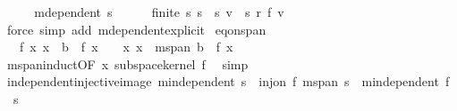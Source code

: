 \begin{isabellebody}
\ \ \isamarkupfalse%
\ \isamarkupfalse%
\ {\isachardoublequoteopen}m{}{\isachardot}{\kern0pt}dependent\ s{\isachardoublequoteclose}\isanewline
\ \ \ \ \isamarkupfalse%
\ {\isacartoucheopen}finite\ s{\isacharprime}{\kern0pt}{\isacartoucheclose}\ {\isacartoucheopen}s{\isacharprime}{\kern0pt}\ {\isasymsubseteq}\ s{\isacartoucheclose}\ {\isacartoucheopen}v\ {\isasymin}\ s{\isacharprime}{\kern0pt}{\isacartoucheclose}\ {\isacartoucheopen}r\ {\isacharparenleft}{\kern0pt}f\ v{\isacharparenright}{\kern0pt}\ {\isasymnoteq}\ {}{\isacartoucheclose}\ \isamarkupfalse%
\ {\isacharparenleft}{\kern0pt}force\ simp\ add{\isacharcolon}{\kern0pt}\ m{}{\isachardot}{\kern0pt}dependent{\isacharunderscore}{\kern0pt}explicit{\isacharparenright}{\kern0pt}\isanewline
{}\isamarkupfalse%
%
\endisatagproof
{\isafoldproof}%
%
\isadelimproof
\isanewline
%
\endisadelimproof
\isanewline
{}\isamarkupfalse%
\ eq{\isacharunderscore}{\kern0pt}{}{\isacharunderscore}{\kern0pt}on{\isacharunderscore}{\kern0pt}span{\isacharcolon}{\kern0pt}\isanewline
\ \ \ f{}{\isacharcolon}{\kern0pt}\ {\isachardoublequoteopen}{\isasymAnd}x{\isachardot}{\kern0pt}\ x\ {\isasymin}\ b\ {\isasymLongrightarrow}\ f\ x\ {\isacharequal}{\kern0pt}\ {}{\isachardoublequoteclose}\ \ x{\isacharcolon}{\kern0pt}\ {\isachardoublequoteopen}x\ {\isasymin}\ m{}{\isachardot}{\kern0pt}span\ b{\isachardoublequoteclose}\ \ {\isachardoublequoteopen}f\ x\ {\isacharequal}{\kern0pt}\ {}{\isachardoublequoteclose}\isanewline
%
\isadelimproof
\ \ %
\endisadelimproof
%
\isatagproof
{}\isamarkupfalse%
\ m{}{\isachardot}{\kern0pt}span{\isacharunderscore}{\kern0pt}induct{\isacharbrackleft}{\kern0pt}OF\ x\ subspace{\isacharunderscore}{\kern0pt}kernel{\isacharbrackright}{\kern0pt}\ f{}\ \isamarkupfalse%
\ simp%
\endisatagproof
{\isafoldproof}%
%
\isadelimproof
\isanewline
%
\endisadelimproof
\isanewline
{}\isamarkupfalse%
\ independent{\isacharunderscore}{\kern0pt}injective{\isacharunderscore}{\kern0pt}image{\isacharcolon}{\kern0pt}\ {\isachardoublequoteopen}m{}{\isachardot}{\kern0pt}independent\ s\ {\isasymLongrightarrow}\ inj{\isacharunderscore}{\kern0pt}on\ f\ {\isacharparenleft}{\kern0pt}m{}{\isachardot}{\kern0pt}span\ s{\isacharparenright}{\kern0pt}\ {\isasymLongrightarrow}\ m{}{\isachardot}{\kern0pt}independent\ {\isacharparenleft}{\kern0pt}f\ {\isacharbackquote}{\kern0pt}\ s{\isacharparenright}{\kern0pt}{\isachardoublequoteclose}\isanewline

\end{isabellebody}
